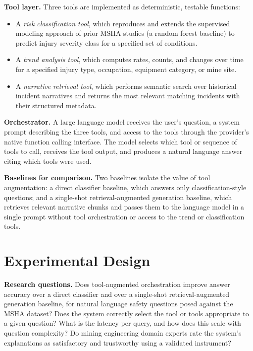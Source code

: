 \documentclass[11pt,a4paper]{article}
\begin{document}
\textbf{Tool layer.} Three tools are implemented as deterministic, testable
functions:
\begin{itemize}
  \item A \emph{risk classification tool}, which reproduces and extends the
    supervised modeling approach of prior MSHA studies (a random forest
    baseline) to predict injury severity class for a specified set of
    conditions.
  \item A \emph{trend analysis tool}, which computes rates, counts, and changes
    over time for a specified injury type, occupation, equipment category, or
    mine site.
  \item A \emph{narrative retrieval tool}, which performs semantic search over
    historical incident narratives and returns the most relevant matching
    incidents with their structured metadata.
\end{itemize}

\textbf{Orchestrator.} A large language model receives the user's question,
a system prompt describing the three tools, and access to the tools through
the provider's native function calling interface. The model selects which tool
or sequence of tools to call, receives the tool output, and produces a natural
language answer citing which tools were used.

\textbf{Baselines for comparison.} Two baselines isolate the value of tool
augmentation: a direct classifier baseline, which answers only classification-style
questions; and a single-shot retrieval-augmented generation baseline, which
retrieves relevant narrative chunks and passes them to the language model in
a single prompt without tool orchestration or access to the trend or
classification tools.

\section{Experimental Design}
\label{sec:experiments}

\textbf{Research questions.} Does tool-augmented orchestration improve answer
accuracy over a direct classifier and over a single-shot retrieval-augmented
generation baseline, for natural language safety questions posed against the
MSHA dataset? Does the system correctly select the tool or tools appropriate
to a given question? What is the latency per query, and how does this scale
with question complexity? Do mining engineering domain experts rate the
system's explanations as satisfactory and trustworthy using a validated
instrument?
\end{document}
